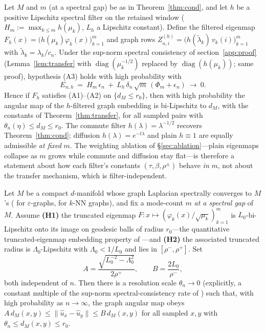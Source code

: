 \documentclass[review]{siamart220329}
\begin{document}
\begin{corollary}\label{cor:filtered}
Let $M$ and $m$ (at a spectral gap) be as in Theorem~\ref{thm:cond}, and
let $h$ be a positive Lipschitz spectral filter on the retained window
($H_m:=\max_{k\le m}h(\mu_k)$, $L_h$ a Lipschitz constant). Define the filtered
eigenmap $F_h(x)=\big(h(\mu_k)\varphi_k(x)\big)_{k=1}^m$ and graph rows
$Z^{(h)}_{n,i}=\big(h(\tilde\lambda_k)\,v_k(i)\big)_{k=1}^m$ with
$\tilde\lambda_k=\lambda_k/c_n$. Under the sup-norm spectral consistency of
section~\ref{app:proof} (Lemma~\ref{lem:transfer} with
$\operatorname{diag}(\mu_k^{-1/2})$ replaced by
$\operatorname{diag}(h(\mu_k))$; same proof), hypothesis (A3) holds with high
probability with
\[
E_{n,h}\ =\ H_m\,\epsilon_n\ +\ L_h\,\delta_n\,\sqrt m\,(\Phi_m+\epsilon_n)
\ \longrightarrow\ 0 .
\]
Hence if $F_h$ satisfies (A1)--(A2) on $\{d_M\le r_0\}$, then with high
probability the angular map of the $h$-filtered graph embedding is
bi-Lipschitz to $d_M$, with the constants of Theorem~\ref{thm:transfer}, for
all sampled pairs with $\theta_n(\eta)\le d_M\le r_0$. The commute filter
$h(\lambda)=\lambda^{-1/2}$ recovers Theorem~\ref{thm:cond}; diffusion
$h(\lambda)=e^{-t\lambda}$ and plain $h\equiv1$ are equally admissible \emph{at
fixed} $m$. The weighting ablation of \S\ref{sec:ablation}---plain eigenmaps
collapse as $m$ grows while commute and diffusion stay flat---is therefore a
statement about how each filter's constants $(\tau,\beta,\rho^\pm)$ behave
\emph{in} $m$, not about the transfer mechanism, which is filter-independent.
\end{corollary}

\begin{theorem}\label{thm:cond}
Let $M$ be a compact $d$-manifold whose graph Laplacian spectrally converges
to $M$'s (\cite{garciatrillos2018} for $\varepsilon$-graphs, \cite{calder2022}
for $k$-NN graphs), and fix a mode-count $m$ \emph{at a spectral gap} of $M$.
Assume \textbf{(H1)} the truncated eigenmap
$F:x\mapsto(\varphi_k(x)/\sqrt{\mu_k})_{k=1}^m$ is $L_0$-bi-Lipschitz onto its image
on geodesic balls of radius $r_0$---the quantitative truncated-eigenmap embedding
property of \cite{berard1994,bates2014,portegies2016}---and \textbf{(H2)} the
associated truncated radius is $\Lambda_0$-Lipschitz with $\Lambda_0<1/L_0$ and
lies in $[\rho^-,\rho^+]$. Set
\[
A=\frac{\sqrt{L_0^{-2}-\Lambda_0^{2}}}{2\rho^{+}},\qquad
B=\frac{2L_0}{\rho^{-}},
\]
both independent of $n$. Then there is a resolution scale $\theta_n\to0$
(explicitly, a constant multiple of the sup-norm spectral-consistency rate of
\cite{calder2022}) such that, with high probability as $n\to\infty$, the graph
angular map obeys
$A\,d_M(x,y)\le\lVert\hat u_x-\hat u_y\rVert\le B\,d_M(x,y)$ for all sampled $x,y$
with $\theta_n\le d_M(x,y)\le r_0$.
\end{theorem}
\end{document}
